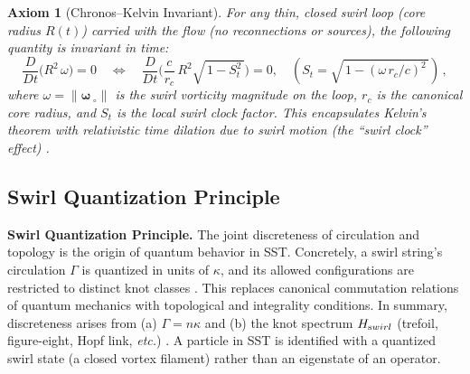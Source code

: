 \documentclass[11pt]{article}
\newtheorem{axiom}{Axiom}
\begin{document}
	\begin{axiom}[Chronos--Kelvin Invariant]\label{ax:chronos-kelvin}
	For any thin, closed swirl loop (core radius $R(t)$) carried with the flow (no reconnections or sources), the following quantity is invariant in time:
	\[
		\frac{D}{Dt}\Big(R^2\,\omega\Big)=0 \quad\Longleftrightarrow\quad \frac{D}{Dt}\Big(\frac{c}{r_c}\,R^2\sqrt{\,1 - S_t^2\,}\Big)=0, \quad (S_t = \sqrt{\,1 - (\omega\,r_c/c)^2\,})\,,
	\]
	where $\omega=\|\boldsymbol{\omega}_{\!\!\;\circ}\|$ is the swirl vorticity magnitude on the loop, $r_c$ is the canonical core radius, and $S_t$ is the local swirl clock factor. This encapsulates Kelvin’s theorem with relativistic time dilation due to swirl motion (the ``swirl clock'' effect) \cite{Batchelor1967,Saffman1992,Iskandarani2025Canon034}.
	\end{axiom}

	\subsection{Swirl Quantization Principle}
	\textbf{Swirl Quantization Principle.} The joint discreteness of circulation and topology is the origin of quantum behavior in SST. Concretely, a swirl string’s circulation $\Gamma$ is quantized in units of $\kappa$, and its allowed configurations are restricted to distinct knot classes \cite{Onsager1949,Feynman1955,Iskandarani2025Canon034}. This replaces canonical commutation relations of quantum mechanics with topological and integrality conditions. In summary, discreteness arises from (a) $\Gamma = n\kappa$ and (b) the knot spectrum $H_{\textrm swirl}$ (trefoil, figure-eight, Hopf link, \emph{etc.}) \cite{Iskandarani2025Canon034}. A particle in SST is identified with a quantized swirl state (a closed vortex filament) rather than an eigenstate of an operator.
\end{document}
